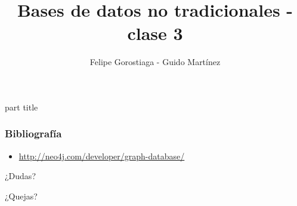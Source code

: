 \documentclass[obeyspaces,spaces,hyphens,handout]{beamer}
\begin{document}
\title{Bases de datos no tradicionales - clase 3}
\author{Felipe Gorostiaga - Guido Martínez}

\begin{frame}
  \titlepage
\end{frame}

\AtBeginSection{\frame{\sectionpage}}

{
	\begin{centering}
	\begin{beamercolorbox}[sep=12pt,center]{part title}
	\bf{\insertsection}\par
	\end{beamercolorbox}
	\end{centering}
}

\newcommand{\dquote}{\texttt{\char`\"}}





\begin{frame}
\frametitle{Bibliografía}
\begin{itemize}
	\footnotesize
	\item \url{http://neo4j.com/developer/graph-database/}
\end{itemize}
\end{frame}

\begin{frame}
\begin{center}
	¿Dudas?
	\pause

	¿Quejas?
\end{center}
\end{frame}
\end{document}
